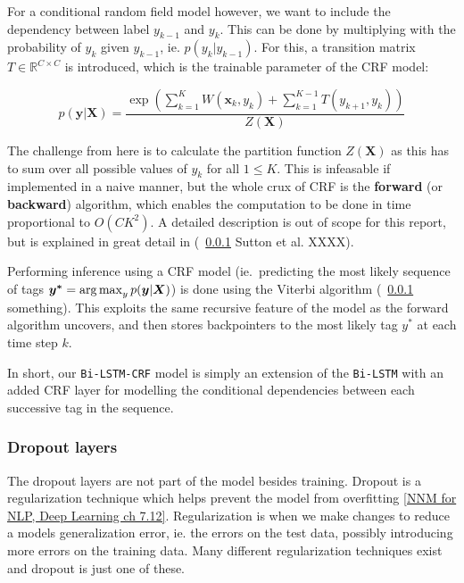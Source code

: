 For a conditional random field model however, we want to include the
dependency between label $y_{k-1}$ and $y_{k}$. This can be done by multiplying
with the probability of $y_{k}$ given $y_{k-1}$, ie. $p(y_{k}|y_{k-1})$. For
this, a transition matrix $T \in \mathbb{R}^{C \times C}$ is introduced, which 
is the trainable parameter of the CRF model:

\begin{equation*}
p(\bm{y}|\bm{X}) = \frac{\exp( \sum_{k=1}^{K} W(\bm{x}_k, y_{k}) +
                    \sum_{k=1}^{K-1} T(y_{k+1}, y_{k}) )}{Z(\bm{X})}
\end{equation*}

The challenge from here is to calculate the partition function $Z(\bm{X})$ as
this has to sum over all possible values of $y_{k}$ for all $1 \leq K$. This is
infeasable if implemented in a naive manner, but the whole crux of CRF is the
\textbf{forward} (or \textbf{backward}) algorithm, which enables the computation
to be done in time proportional to $O(CK^{2})$. A detailed description is out of
scope for this report, but is explained in great detail in (~\ref{} Sutton et
al. XXXX).

Performing inference using a CRF model (ie.\ predicting the most likely sequence
of tags $\bm{y^{*}} = \operatorname*{arg\,max}_{y}p(\bm{y}|\bm{X})$) is done using the Viterbi
algorithm (~\ref{} something). This exploits the same recursive feature of the
model as the forward algorithm uncovers, and then stores backpointers to the
most likely tag $y^{*}$ at each time step $k$.

In short, our \texttt{Bi-LSTM-CRF} model is simply an extension of the
\texttt{Bi-LSTM} with an added CRF layer for modelling the conditional
dependencies between each successive tag in the sequence. 

\subsubsection{Dropout layers}

The dropout layers are not part of the model besides training. Dropout is a
regularization technique which helps prevent the model from overfitting \ref{NNM
for NLP, Deep Learning ch 7.12}. Regularization is when we make changes to
reduce a models generalization error, ie. the errors on the test data, possibly
introducing more errors on the training data. Many different regularization
techniques exist and dropout is just one of these.

